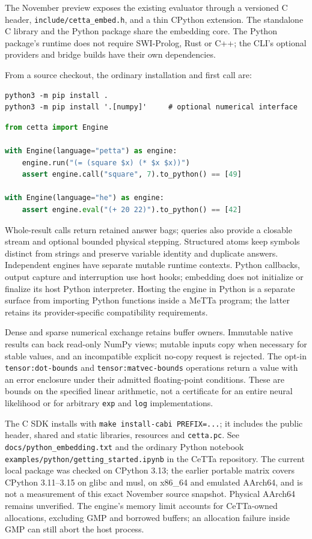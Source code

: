 \documentclass[11pt]{article}
\newcommand{\code}[1]{\texttt{#1}}
\begin{document}
The November preview exposes the existing evaluator through a versioned C
header, \code{include/cetta\_embed.h}, and a thin CPython extension.  The
standalone C library and the Python package share the embedding core.  The
Python package's runtime does not require SWI-Prolog, Rust or C++; the CLI's
optional providers and bridge builds have their own dependencies.

From a source checkout, the ordinary installation and first call are:
\begin{lstlisting}
python3 -m pip install .
python3 -m pip install '.[numpy]'     # optional numerical interface
\end{lstlisting}
\begin{lstlisting}[language=Python]
from cetta import Engine

with Engine(language="petta") as engine:
    engine.run("(= (square $x) (* $x $x))")
    assert engine.call("square", 7).to_python() == [49]

with Engine(language="he") as engine:
    assert engine.eval("(+ 20 22)").to_python() == [42]
\end{lstlisting}

Whole-result calls return retained answer bags; queries also provide a
closable stream and optional bounded physical stepping.  Structured atoms
keep symbols distinct from strings and preserve variable identity and
duplicate answers.  Independent engines have separate mutable runtime
contexts.  Python callbacks, output capture and interruption use host hooks;
embedding does not initialize or finalize its host Python interpreter.
Hosting the engine in Python is a separate surface from importing Python
functions inside a MeTTa program; the latter retains its provider-specific
compatibility requirements.

Dense and sparse numerical exchange retains buffer owners.  Immutable native
results can back read-only NumPy views; mutable inputs copy when necessary
for stable values, and an incompatible explicit no-copy request is rejected.
The opt-in \code{tensor:dot-bounds} and \code{tensor:matvec-bounds} operations
return a value with an error enclosure under their admitted floating-point
conditions.  These are bounds on the specified linear arithmetic, not a
certificate for an entire neural likelihood or for arbitrary \code{exp} and
\code{log} implementations.

The C SDK installs with \code{make install-cabi PREFIX=...}; it includes the
public header, shared and static libraries, resources and \code{cetta.pc}.
See \code{docs/python\_embedding.txt} and the ordinary Python notebook
\code{examples/python/getting\_started.ipynb} in the CeTTa repository.
The current local package was checked on CPython 3.13; the earlier portable
matrix covers CPython 3.11--3.15 on glibc and musl, on x86\_64 and emulated
AArch64, and is not a measurement of this exact November source snapshot.
Physical AArch64 remains unverified.  The engine's memory limit accounts for
CeTTa-owned allocations, excluding GMP and borrowed buffers; an allocation
failure inside GMP can still abort the host process.
\end{document}
